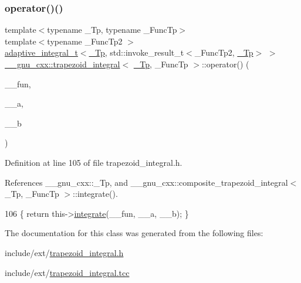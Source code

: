 \subsubsection{\texorpdfstring{operator()()}{operator()()}\hspace{0.1cm}{\footnotesize\ttfamily [2/2]}}
{\footnotesize\ttfamily template$<$typename \+\_\+\+Tp, typename \+\_\+\+Func\+Tp$>$ \\
template$<$typename \+\_\+\+Func\+Tp2 $>$ \\
\hyperlink{struct____gnu__cxx_1_1adaptive__integral__t}{adaptive\+\_\+integral\+\_\+t}$<$\hyperlink{namespace____gnu__cxx_a3b19a9c800ca194374ef9172290f7d79}{\+\_\+\+Tp}, std\+::invoke\+\_\+result\+\_\+t$<$\+\_\+\+Func\+Tp2, \hyperlink{namespace____gnu__cxx_a3b19a9c800ca194374ef9172290f7d79}{\+\_\+\+Tp}$>$ $>$ \hyperlink{class____gnu__cxx_1_1trapezoid__integral}{\+\_\+\+\_\+gnu\+\_\+cxx\+::trapezoid\+\_\+integral}$<$ \hyperlink{namespace____gnu__cxx_a3b19a9c800ca194374ef9172290f7d79}{\+\_\+\+Tp}, \+\_\+\+Func\+Tp $>$\+::operator() (\begin{DoxyParamCaption}\item[{\+\_\+\+Func\+Tp2}]{\+\_\+\+\_\+fun,  }\item[{\hyperlink{namespace____gnu__cxx_a3b19a9c800ca194374ef9172290f7d79}{\+\_\+\+Tp}}]{\+\_\+\+\_\+a,  }\item[{\hyperlink{namespace____gnu__cxx_a3b19a9c800ca194374ef9172290f7d79}{\+\_\+\+Tp}}]{\+\_\+\+\_\+b }\end{DoxyParamCaption})\hspace{0.3cm}{\ttfamily [inline]}}



Definition at line 105 of file trapezoid\+\_\+integral.\+h.



References \+\_\+\+\_\+gnu\+\_\+cxx\+::\+\_\+\+Tp, and \+\_\+\+\_\+gnu\+\_\+cxx\+::composite\+\_\+trapezoid\+\_\+integral$<$ \+\_\+\+Tp, \+\_\+\+Func\+Tp $>$\+::integrate().


\begin{DoxyCode}
106         \{ \textcolor{keywordflow}{return} this->\hyperlink{class____gnu__cxx_1_1trapezoid__integral_a11b2aa6156935929b6221be677c6f10f}{integrate}(\_\_fun, \_\_a, \_\_b); \}
\end{DoxyCode}


The documentation for this class was generated from the following files\+:\begin{DoxyCompactItemize}
\item 
include/ext/\hyperlink{trapezoid__integral_8h}{trapezoid\+\_\+integral.\+h}\item 
include/ext/\hyperlink{trapezoid__integral_8tcc}{trapezoid\+\_\+integral.\+tcc}\end{DoxyCompactItemize}
